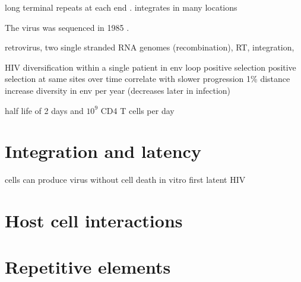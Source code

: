\documentclass[../sherrill-Mix_thesis.tex]{subfiles}
\begin{document}
\begin{description}
\end{description}









long terminal repeats at each end \citep{Hughes1978}. integrates in many locations \citep{Hughes1978}


The virus was sequenced in 1985 \citep{Wain-Hobson1985}.

retrovirus, two single stranded RNA genomes (recombination), RT, integration,

HIV diversification within a single patient in env loop \citep{Holmes1992} positive selection \citep{Bonhoeffer1995,Ross2002} positive selection at same sites over time correlate with slower progression \citep{Wolinsky1996,Ross2002} 1\% distance increase diversity in env per year (decreases later in infection) \citep{Shankarappa1999}

half life of 2 days and $10^9$ CD4 T cells per day \citep{Ho1995,Wei1995}
\section{Integration and latency}
	cells can produce virus without cell death in vitro \citep{Hoxie1985}
	first latent HIV \citep{Folks1986}
\section{Host cell interactions}
\section{Repetitive elements}
\end{document}
